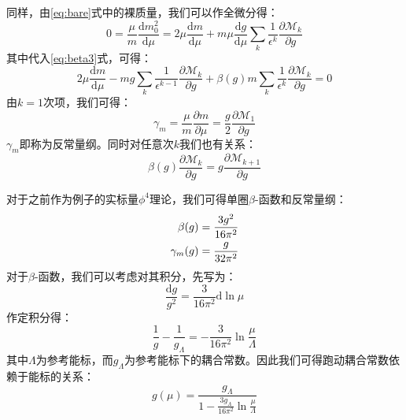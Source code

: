 同样，由\eqref{eq:bare}式中的裸质量，我们可以作全微分得：
\begin{equation}
0=\frac{\mu}{m}\frac{\mathrm{d}m_0^2}{\mathrm{d}\mu}=2\mu\frac{\mathrm{d}m}{\mathrm{d}\mu}+m\mu\frac{\mathrm{d}g}{\mathrm{d}\mu}\sum_k\frac{1}{\epsilon^k}\frac{\partial\mathscr{M}_k}{\partial g}
\end{equation}
其中代入\eqref{eq:beta3}式，可得：
\begin{equation}
2\mu\frac{\mathrm{d}m}{\mathrm{d}\mu}-mg\sum_k\frac{1}{\epsilon^{k-1}}\frac{\partial\mathscr{M}_k}{\partial g}+\beta(g)m\sum_k\frac{1}{\epsilon^k}\frac{\partial\mathscr{M}_k}{\partial g}=0
\end{equation}
由$k=1$次项，我们可得：
\begin{equation}
\gamma_m=\frac{\mu}{m}\frac{\partial m}{\partial\mu}=\frac{g}{2}\frac{\partial\mathscr{M}_1}{\partial g}
\end{equation}
$\gamma_m$即称为反常量纲。同时对任意次$k$我们也有关系：
\begin{equation}
\beta(g)\frac{\partial\mathscr{M}_k}{\partial g}=g\frac{\partial\mathscr{M}_{k+1}}{\partial g}
\end{equation}


对于之前作为例子的实标量$\phi^4$理论，我们可得单圈$\beta$-函数和反常量纲：
\begin{align}
\beta(g)=\frac{3g^2}{16\pi^2}\notag\\
\gamma_m(g)=\frac{g}{32\pi^2}
\end{align}
对于$\beta$-函数，我们可以考虑对其积分，先写为：
\begin{equation}
    \frac{\mathrm{d}g}{g^2}=\frac{3}{16\pi^2}\mathrm{d}\ln\mu
\end{equation}
作定积分得：
\begin{equation}
    \frac{1}{g}-\frac{1}{g_\Lambda}=-\frac{3}{16\pi^2}\ln\frac{\mu}{\Lambda}
\end{equation}
其中$\Lambda$为参考能标，而$g_\Lambda$为参考能标下的耦合常数。因此我们可得跑动耦合常数依赖于能标的关系：
\begin{equation}
    g(\mu)=\frac{g_\Lambda}{1-\frac{3g_\Lambda}{16\pi^2}\ln\frac{\mu}{\Lambda}}
\end{equation}

